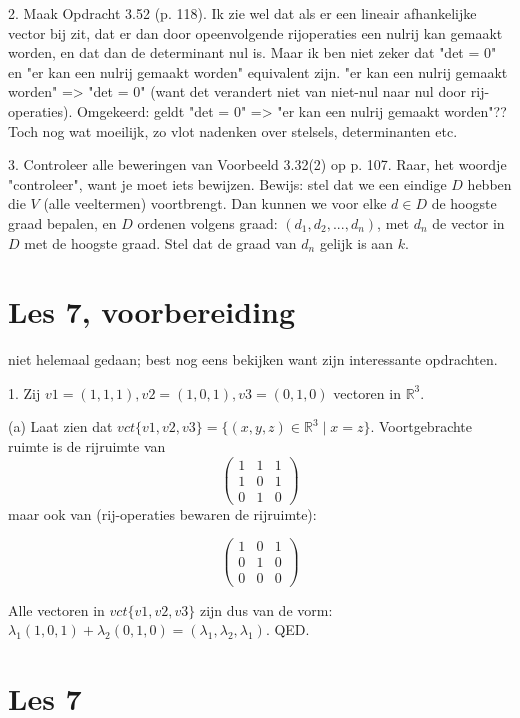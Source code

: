 \documentclass{article}
\begin{document}
2. Maak Opdracht 3.52 (p. 118).  
Ik zie wel dat als er een lineair afhankelijke vector bij zit, dat er dan door opeenvolgende rijoperaties een nulrij kan gemaakt worden, en dat dan de determinant nul is. Maar ik ben niet zeker dat "det = 0" en "er kan een nulrij gemaakt worden" equivalent zijn.  "er kan een nulrij gemaakt worden" => "det = 0" (want det verandert niet van niet-nul naar nul door rij-operaties). Omgekeerd: geldt "det = 0" => "er kan een nulrij gemaakt worden"?? Toch nog wat moeilijk, zo vlot nadenken over stelsels, determinanten etc. 

3. Controleer alle beweringen van Voorbeeld 3.32(2) op p. 107.
Raar, het woordje "controleer", want je moet iets bewijzen. Bewijs: stel dat we een eindige $D$ hebben die $V$ (alle veeltermen) voortbrengt. Dan kunnen we voor elke $d \in D$ de hoogste graad bepalen, en $D$ ordenen volgens graad: $(d_1, d_2, ..., d_n)$, met $d_n$ de vector in $D$ met de hoogste graad. Stel dat de graad van $d_n$ gelijk is aan $k$. 

\section{Les 7, voorbereiding}

niet helemaal gedaan; best nog eens bekijken want zijn interessante opdrachten. 

1. Zij $v1 = (1, 1, 1), v2 = (1, 0, 1), v3 = (0, 1, 0)$ vectoren in $\mathbb{R}^3$.

(a) Laat zien dat $vct\{v1, v2, v3\} = \{(x, y, z) \in \mathbb{R}^3 \mid x = z\}$. 
Voortgebrachte ruimte is de rijruimte van 
\[
\begin{pmatrix}
    1&1&1\\
    1&0&1\\
    0&1&0
\end{pmatrix}
\] 
maar ook van (rij-operaties bewaren de rijruimte): 

\[
\begin{pmatrix}
    1&0&1\\
    0&1&0\\
    0&0&0
\end{pmatrix}
\]

Alle vectoren in $vct\{v1, v2, v3\}$ zijn dus van de vorm: 
$\lambda_1 (1,0,1) + \lambda_2 (0,1,0) = (\lambda_1, \lambda_2, \lambda_1)$. QED. 

\section{Les 7}
\end{document}

